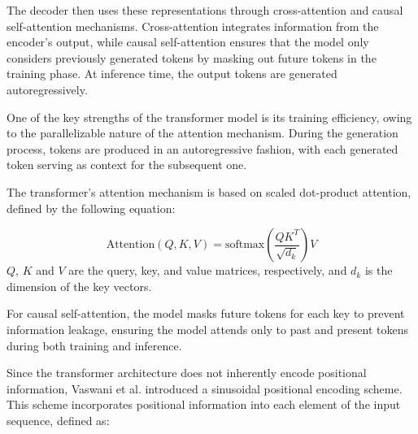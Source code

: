 The decoder then uses these representations through cross-attention and causal self-attention mechanisms. Cross-attention integrates information from the encoder's output, while causal self-attention ensures that the model only considers previously generated tokens by masking out future tokens in the training phase. At inference time, the output tokens are generated autoregressively. 

One of the key strengths of the transformer model is its training efficiency, owing to the parallelizable nature of the attention mechanism. During the generation process, tokens are produced in an autoregressive fashion, with each generated token serving as context for the subsequent one.

The transformer's attention mechanism is based on scaled dot-product attention, defined by the following equation:

\begin{equation}
    \text{Attention}(Q, K, V) = \text{softmax}\left(\frac{Q K^T}{\sqrt{d_k}} \right) V
\end{equation}
$Q$, $K$ and $V$ are the query, key, and value matrices, respectively, and $d_k$ is the dimension of the key vectors.

For causal self-attention, the model masks future tokens for each key to prevent information leakage, ensuring the model attends only to past and present tokens during both training and inference.

Since the transformer architecture does not inherently encode positional information, Vaswani et al. introduced a sinusoidal positional encoding scheme. This scheme incorporates positional information into each element of the input sequence, defined as:





